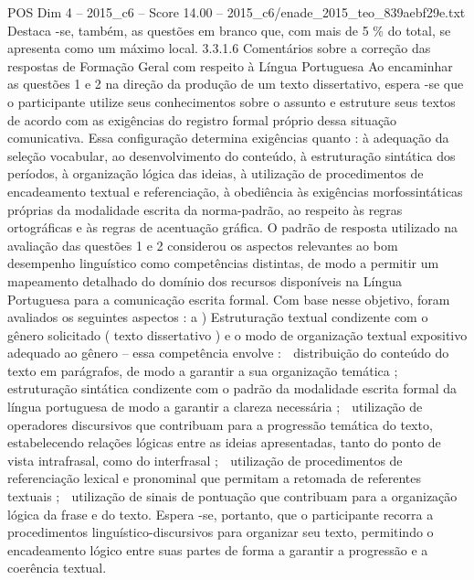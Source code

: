 \begin{textsample}{POS Dim 4 – 2015\_c6 – Score 14.00 – 2015\_c6/enade\_2015\_teo\_839aebf29e.txt}
Destaca -se, também, as questões em branco que, com mais de 5 \% do total, se apresenta como um máximo local. 3.3.1.6 Comentários sobre a correção das respostas de Formação Geral com respeito à Língua Portuguesa Ao encaminhar as questões 1 e 2 na direção da produção de um texto dissertativo, espera -se que o participante utilize seus conhecimentos sobre o assunto e estruture seus textos de acordo com as exigências do registro formal próprio dessa situação comunicativa.
Essa configuração determina exigências quanto : à adequação da seleção vocabular, ao desenvolvimento do conteúdo, à estruturação sintática dos períodos, à organização lógica das ideias, à utilização de procedimentos de encadeamento textual e referenciação, à obediência às exigências morfossintáticas próprias da modalidade escrita da norma-padrão, ao respeito às regras ortográficas e às regras de acentuação gráfica.
O padrão de resposta utilizado na avaliação das questões 1 e 2 considerou os aspectos relevantes ao bom desempenho linguístico como competências distintas, de modo a permitir um mapeamento detalhado do domínio dos recursos disponíveis na Língua Portuguesa para a comunicação escrita formal.
Com base nesse objetivo, foram avaliados os seguintes aspectos : a ) Estruturação textual condizente com o gênero solicitado ( texto dissertativo ) e o modo de organização textual expositivo adequado ao gênero – essa competência envolve :  distribuição do conteúdo do texto em parágrafos, de modo a garantir a sua organização temática ;  estruturação sintática condizente com o padrão da modalidade escrita formal da língua portuguesa de modo a garantir a clareza necessária ;  utilização de operadores discursivos que contribuam para a progressão temática do texto, estabelecendo relações lógicas entre as ideias apresentadas, tanto do ponto de vista intrafrasal, como do interfrasal ;  utilização de procedimentos de referenciação lexical e pronominal que permitam a retomada de referentes textuais ;  utilização de sinais de pontuação que contribuam para a organização lógica da frase e do texto.
Espera -se, portanto, que o participante recorra a procedimentos linguístico-discursivos para organizar seu texto, permitindo o encadeamento lógico entre suas partes de forma a garantir a progressão e a coerência textual.

\end{textsample}
